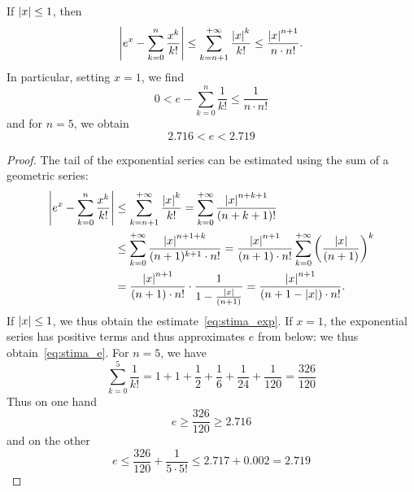 \begin{theorem}
  \label{th:approx_exp}%
  \label{th:approx_e}%
  If ${\left|x\right|}\le 1$, then 
  \begin{equation}\label{eq:stima_exp}
    {\left|e^x - \sum_{k=0}^n \frac{x^k}{k!}\right|}
    \le \sum_{k={n+1}}^{+\infty} \frac{{\left|x\right|}^k}{k!}
    \le \frac{{\left|x\right|}^{n+1}}{n\cdot n!}.
  \end{equation}
  In particular, setting $x=1$, we find
  \begin{equation}\label{eq:stima_e}
     0 < e - \sum_{k=0}^n \frac{1}{k!} \le \frac{1}{n \cdot n!}
  \end{equation}
  and for $n=5$, we obtain
  \begin{equation}
    2.716 < e < 2.719
  \end{equation}
  \end{theorem}
  \begin{proof}
  The tail of the exponential series can be estimated 
  using the sum of a geometric series:
  \begin{align*}
    {\left|e^x - \sum_{k=0}^n \frac {x^k} {k!}\right|}
    & \le \sum_{k=n+1}^{+\infty} \frac{{\left|x\right|}^k}{k!} 
     = \sum_{k=0}^{+\infty}\frac{{\left|x\right|}^{n+k+1}}{(n+k+1)!} \\
    & \le \sum_{k=0}^{+\infty}\frac{{\left|x\right|}^{n+1+k}}{(n+1)^{k+1}\cdot n!}
          = \frac{{\left|x\right|}^{n+1}}{(n+1)\cdot n!}\sum_{k=0}^{+\infty}
     {\left( \frac{{\left|x\right|}}{(n+1)} \right)}^k \\
        & = \frac{{\left|x\right|}^{n+1}}{(n+1)\cdot n!} \cdot
    \frac{1}{1-\frac{{\left|x\right|}}{(n+1)}}
     = \frac{{\left|x\right|}^{n+1}}{(n+1-{\left|x\right|})\cdot n!}.
  \end{align*}
  If ${\left|x\right|}\le 1$, we thus obtain the estimate~\eqref{eq:stima_exp}.
  If $x=1$, the exponential series has positive terms and thus 
  approximates $e$ from below: we thus obtain~\eqref{eq:stima_e}.
  For $n=5$, we have
  \[
   \sum_{k=0}^5 \frac{1}{k!} = 1 + 1 + \frac 1 2 + \frac{1}{6} + \frac {1}{24} + \frac{1}{120}
   = \frac{326}{120}
  \]
  Thus on one hand
  \[
    e \ge \frac{326}{120} \ge 2.716
  \]
  and on the other
  \[
   e \le \frac{326}{120} + \frac{1}{5\cdot 5!}
     \le 2.717 + 0.002 = 2.719
  \]
\end{proof}
  
